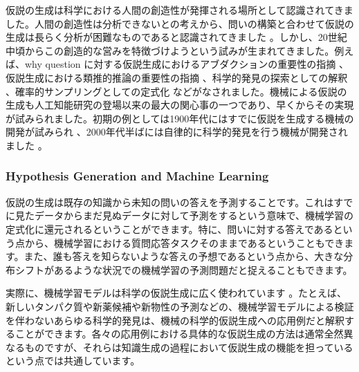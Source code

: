 仮説の生成は科学における人間の創造性が発揮される場所として認識されてきました。人間の創造性は分析できないとの考えから、問いの構築と合わせて仮説の生成は長らく分析が困難なものであると認識されてきました \cite{sep-scientific-discovery}。しかし、20世紀中頃からこの創造的な営みを特徴づけようという試みが生まれてきました。例えば、why question に対する仮説生成におけるアブダクションの重要性の指摘 \cite{hanson1965patterns,magnani2011abduction}、仮説生成における類推的推論の重要性の指摘 \cite{hesse1965models,gentner2002analogy}、科学的発見の探索としての解釈 \cite{langley1987scientific}、確率的サンプリングとしての定式化 \cite{dasgupta2017hypotheses} などがなされました。機械による仮説の生成も人工知能研究の登場以来の最大の関心事の一つであり、早くからその実現が試みられました。初期の例としては1900年代にはすでに仮説を生成する機械の開発が試みられ \cite{langley1987scientific,lindsay1993dendral}、2000年代半ばには自律的に科学的発見を行う機械が開発されました \cite{king2004functional}。

\subsubsection{Hypothesis Generation and Machine Learning}

仮説の生成は既存の知識から未知の問いの答えを予測することです。これはすでに見たデータからまだ見ぬデータに対して予測をするという意味で、機械学習の定式化に還元されるということができます。特に、問いに対する答えであるという点から、機械学習における質問応答タスクそのままであるということもできます。また、誰も答えを知らないような答えの予想であるという点から、大きな分布シフトがあるような状況での機械学習の予測問題だと捉えることもできます。


実際に、機械学習モデルは科学の仮説生成に広く使われています \cite{xu2021artificial,zhang2023artificial,wang2023scientific}。たとえば、新しいタンパク質や新薬候補や新物性の予測などの、機械学習モデルによる検証を伴わないあらゆる科学的発見は、機械の科学的仮説生成への応用例だと解釈することができます。各々の応用例における具体的な仮説生成の方法は通常全然異なるものですが、それらは知識生成の過程において仮説生成の機能を担っているという点では共通しています。


